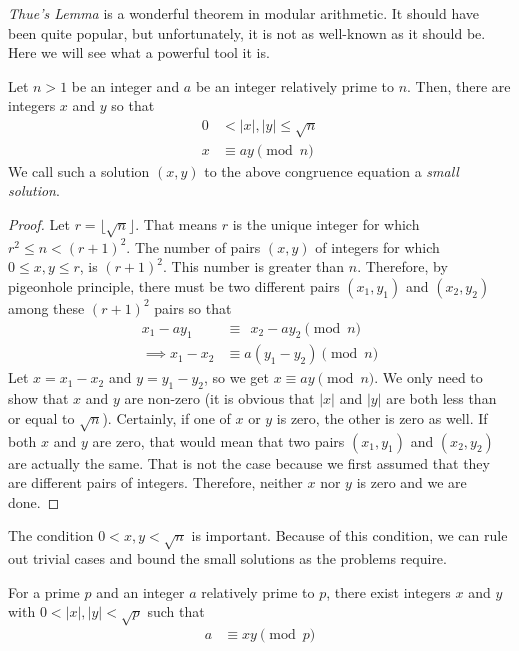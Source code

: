 \documentclass{subfile}
\begin{document}
\textit{Thue's Lemma} is a wonderful theorem in modular arithmetic. It should have been quite popular, but unfortunately, it is not as well-known as it should be. Here we will see what a powerful tool it is.

\begin{theorem}\label{thm:thue}
	Let $n>1$ be an integer and $a$ be an integer relatively prime to $n$. Then, there are integers $x$ and $y$ so that
	\begin{align*}
		0 &< |x|, |y| \leq \sqrt n\\
		x&\equiv ay\pmod n
	\end{align*}
	We call such a solution $(x,y)$ to the above congruence equation a \textit{small solution}.
\end{theorem}

\begin{proof}
	Let $r=\lfloor\sqrt{n}\rfloor$. That means $r$ is the unique integer for which $r^2\leq n<(r+1)^2$. The number of pairs $(x,y)$ of integers for which $0\leq x,y\leq r$, is $(r+1)^2$. This number is greater than $n$. Therefore, by pigeonhole principle, there must be two different pairs $(x_1,y_1)$ and $(x_2,y_2)$ among these $(r+1)^2$ pairs so that
	\begin{align*}
		x_1-ay_1
			& \equiv \ \ x_2-ay_2 \pmod n\\
		\implies x_1-x_2
			& \equiv a(y_1-y_2) \pmod n
	\end{align*}
	Let $x=x_1-x_2$ and $y=y_1-y_2$, so we get $x\equiv ay\pmod n$. We only need to show that $x$ and $y$ are non-zero (it is obvious that $|x|$ and $|y|$ are both less than or equal to $\sqrt n$). Certainly, if one of $x$ or $y$ is zero, the other is zero as well. If both $x$ and $y$ are zero, that would mean that two pairs $(x_1,y_1)$ and $(x_2,y_2)$ are actually the same. That is not the case because we first assumed that they are different pairs of integers. Therefore, neither $x$ nor $y$ is zero and we are done.
\end{proof}

	\begin{note}
		The condition $0<x,y<\sqrt{n}$ is important. Because of this condition, we can rule out trivial cases and bound the small solutions as the problems require.
	\end{note}

	\begin{corollary}
		For a prime $p$ and an integer $a$ relatively prime to $p$, there exist integers $x$ and $y$ with $0<|x|,|y|<\sqrt{p}$ such that
		\begin{align*}
			a & \equiv xy\pmod p
		\end{align*}
	\end{corollary}
\end{document}
